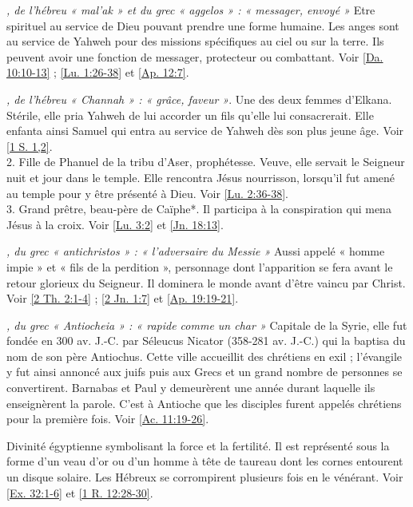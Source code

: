 \begin{multicols}{2}
\textit{, de l'hébreu « mal'ak » et du grec « aggelos » : « messager, envoyé »}\newline
Etre spirituel au service de Dieu pouvant prendre une forme humaine. Les anges sont au service de Yahweh pour des missions spécifiques au ciel ou sur la terre. Ils peuvent avoir une fonction de messager, protecteur ou combattant. Voir \vref{Da. 10:10-13} ; \vref{Lu. 1:26-38} et \vref{Ap. 12:7}.

\textit{, de l'hébreu « Channah » : « grâce, faveur »}. Une des deux femmes d'Elkana. Stérile, elle pria Yahweh de lui accorder un fils qu'elle lui consacrerait. Elle enfanta ainsi Samuel qui entra au service de Yahweh dès son plus jeune âge. Voir \vref{1 S. 1,2}.
\\2. Fille de Phanuel de la tribu d'Aser, prophétesse. Veuve, elle servait le Seigneur nuit et jour dans le temple. Elle rencontra Jésus nourrisson, lorsqu'il fut amené au temple pour y être présenté à Dieu. Voir \vref{Lu. 2:36-38}.
\\3. Grand prêtre, beau-père de Caïphe*. Il participa à la conspiration qui mena Jésus à la croix. Voir \vref{Lu. 3:2} et \vref{Jn. 18:13}.

\textit{, du grec « antichristos » : « l'adversaire du Messie »}\newline
Aussi appelé « homme impie » et « fils de la perdition », personnage dont l'apparition se fera avant le retour glorieux du Seigneur. Il dominera le monde avant d'être vaincu par Christ. Voir \vref{2 Th. 2:1-4} ; \vref{2 Jn. 1:7} et \vref{Ap. 19:19-21}.

\textit{, du grec « Antiocheia » : « rapide comme un char »}\newline
Capitale de la Syrie, elle fut fondée en 300 av. J.-C. par Séleucus Nicator (358-281 av. J.-C.) qui la baptisa du nom de son père Antiochus. Cette ville accueillit des chrétiens en exil ; l'évangile y fut ainsi annoncé aux juifs puis aux Grecs et un grand nombre de personnes se convertirent. Barnabas et Paul y demeurèrent une année durant laquelle ils enseignèrent la parole. C'est à Antioche que les disciples furent appelés chrétiens pour la première fois. Voir \vref{Ac. 11:19-26}.

\textit{}\newline
Divinité égyptienne symbolisant la force et la fertilité. Il est représenté sous la forme d'un veau d'or ou d'un homme à tête de taureau dont les cornes entourent un disque solaire. Les Hébreux se corrompirent plusieurs fois en le vénérant. Voir \vref{Ex. 32:1-6} et \vref{1 R. 12:28-30}.


\end{multicols}
